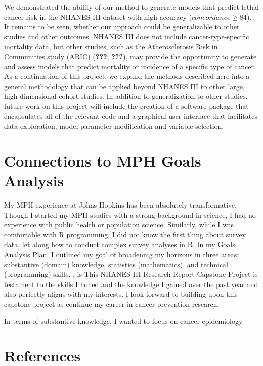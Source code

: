 \documentclass[12pt,twoside]{reedthesis}
\theoremstyle{definition}
\theoremstyle{definition}
\theoremstyle{definition}
\theoremstyle{remark}
\begin{document}
We demonstrated the ability of our method to generate models that
predict lethal cancer risk in the NHANES III dataset with high accuracy
(\(concordance \geq 84\)). It remains to be seen, whether our approach
could be generalizable to other studies and other outcomes. NHANES III
does not include cancer-type-specific mortality data, but other studies,
such as the Atherosclerosis Risk in Communities study (ARIC)
({\textbf{???}}; {\textbf{???}}), may provide the opportunity to
generate and assess models that predict mortality or incidence of a
specific type of cancer. As a continuation of this project, we expand
the methods described here into a general methodology that can be
applied beyond NHANES III to other large, high-dimensional cohort
studies. In addition to generalization to other studies, future work on
this project will include the creation of a software package that
encapsulates all of the relevant code and a graphical user interface
that facilitates data exploration, model parameter modification and
variable selection.

\hypertarget{connections-to-mph-goals-analysis}{%
\section{Connections to MPH Goals
Analysis}\label{connections-to-mph-goals-analysis}}

My MPH experience at Johns Hopkins has been absolutely transformative.
Though I started my MPH studies with a strong background in science, I
had no experience with public health or population science. Similarly,
while I was comfortable with R programming, I did not know the first
thing about survey data, let along how to conduct complex survey
analyses in R. In my Goals Analysis Plan, I outlined my goal of
broadening my horizons in three areas: substantive (domain) knowledge,
statistics (mathematics), and technical (programming) skills. , is This
NHANES III Research Report Capstone Project is testament to the skills I
honed and the knowledge I gained over the past year and also perfectly
aligns with my interests. I look forward to building upon this capstone
project as continue my career in cancer prevention research.

In terms of substantive knowledge, I wanted to focus on cancer
epidemiology

\hypertarget{references}{%
\section{References}\label{references}}
\end{document}

